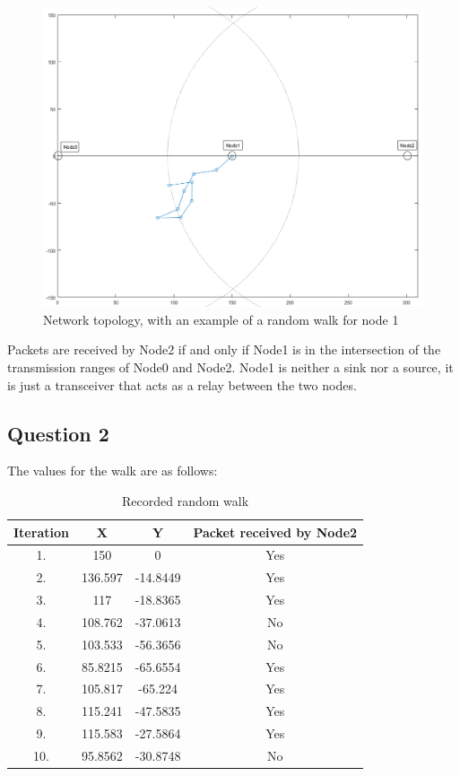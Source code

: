 \documentclass[11pt,journal]{article}
\begin{document}
	\begin{figure}[h]
		\centering
		\includegraphics[scale=0.4]{lab4ii_walk_matlab.png}
		\caption{Network topology, with an example of a random walk for node 1}
	\end{figure}
	Packets are received by Node2 if and only if Node1 is in the intersection of the transmission ranges of Node0 and Node2. Node1 is neither a sink nor a source, it is just a transceiver that acts as a relay between the two nodes.
	\subsection{Question 2}
	The values for the walk are as follows:
	\begin{table}[h]
		\centering
		\begin{tabular}{|c|c|c|c|}
			\hline
			Iteration & X & Y & Packet received by Node2\\
			\hline
			1. & 150 & 0 & Yes\\
			\hline
			2. & 136.597 & -14.8449 & Yes\\
			\hline
			3. & 117 & -18.8365 & Yes\\
			\hline
			4. & 108.762 & -37.0613 & No\\
			\hline
			5. & 103.533 & -56.3656 & No\\
			\hline
			6. & 85.8215 & -65.6554 & Yes\\
			\hline
			7. & 105.817 & -65.224 & Yes\\
			\hline
			8. & 115.241 & -47.5835 & Yes\\
			\hline
			9. & 115.583 & -27.5864 & Yes\\
			\hline
			10. & 95.8562 & -30.8748 & No\\
			\hline
		\end{tabular}
	\caption{Recorded random walk}
	
	\end{table}
\end{document}
